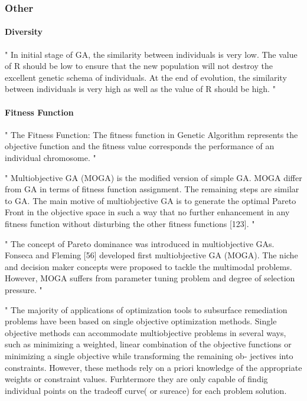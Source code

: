 \subsubsection{Other}
\paragraph{Diversity}
"
In initial stage of GA, the similarity between individuals is very low. The value of R should be low to ensure that the new population will not destroy the excellent genetic schema of individuals. At the end of evolution, the similarity between individuals is very high as well as the value of R should be high.
"\cite{katoch_review_2021}


\paragraph{Fitness Function}
"
The Fitness Function: The fitness function in Genetic Algorithm represents the objective function and the fitness value corresponds the performance of an individual chromosome.
"\cite{majumdar_genetic_2015}


"
Multiobjective GA (MOGA) is the modified version of simple GA. MOGA differ from GA in terms of fitness function assignment. The remaining steps are similar to GA. The main motive of multiobjective GA is to generate the optimal Pareto Front in the objective space in such a way that no further enhancement in any fitness function without disturbing the other fitness functions [123].
"\cite{katoch_review_2021}


"
The concept of Pareto dominance was introduced in multiobjective GAs. Fonseca and Fleming [56] developed first multiobjective GA (MOGA). The niche and decision maker concepts were proposed to tackle the multimodal problems. However, MOGA suffers from parameter tuning problem and degree of selection pressure.
"\cite{katoch_review_2021}

"
The majority of applications of optimization tools to subsurface remediation problems have been based on single objective optimization methods. Single objective methods can accommodate multiobjective problems in several ways, such as minimizing a weighted, linear combination of the objective functions or minimizing a single objective while transforming the remaining ob- jectives into constraints. However, these methods rely on a priori knowledge of the appropriate weights or constraint values. Furhtermore they are only capable of findig individual points on the tradeoff curve( or sureace) for each problem solution.




